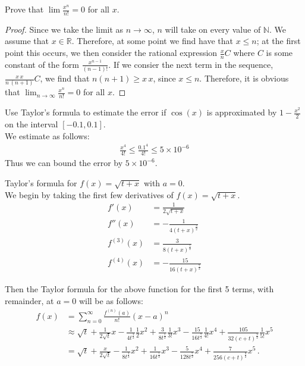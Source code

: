 \documentclass[12pt]{book}
\newcommand{\N}{\mathbb{N}}
\newcommand{\R}{\mathbb{R}}
\newenvironment{exercise}[2][Exercise]{\begin{trivlist}
\item[\hskip \labelsep {\bfseries #1}\hskip \labelsep {\bfseries #2.}]}{\end{trivlist}}
\begin{document}
\begin{exercise}{6.5.1}
Prove that $\lim \frac{x^n}{n!} = 0$ for all $x$.

\begin{proof}
    Since we take the limit as $n \to \infty$, $n$ will take on every value of $\N$. We assume that $x \in \R$. Therefore, at some point we find have that $x \leq n$; at the first point this occurs, we then consider the rational expression $\frac{x}{n} C$ where $C$ is some constant of the form $\frac{x^{n-1}}{\left(n-1\right)!}$. If we consier the next term in the sequence, $\frac{x\, x}{n\, (n+1)}C$, we find that $n \left(n+1\right)\geq x\,x$, since $x\leq n$. Therefore, it is obvious that $\lim_{n \to \infty} \frac{x^n}{n!}=0$ for all $x$.  
\end{proof}
\end{exercise}



\begin{exercise}{6.5.3}
Use Taylor's formula to estimate the error if $\cos(x)$ is approximated by $1-\frac{x^2}{2}$ on the interval $[-0.1,0.1]$. \\

We estimate as follows:
    \begin{align*}
       \frac{x^4}{4!} \leq \frac{0.1^4}{4!} \leq 5\times10^{-6}
    \end{align*}
    Thus we can bound the error by $5\times10^{-6}$.
\end{exercise}



\begin{exercise}{6.5.5}
Taylor's formula for $f(x) = \sqrt{ t+x}$ with $a=0$. \\

We begin by taking the first few derivatives of $f(x) = \sqrt{t+x}$.
    \begin{align*}
    f'(x) &= \frac{1}{2 \sqrt{t + x}} \\
    f''(x) &= - \frac{1}{4 \left(t + x\right)^{\frac{3}{2}}} \\
    f^{(3)} (x) &= \frac{3}{8 \left(t + x\right)^{\frac{5}{2}}} \\
    f^{(4)} (x) &= - \frac{15}{16 \left(t + x\right)^{\frac{7}{2}}}
    \end{align*}
    
    Then the Taylor formula for the above function for the first 5 terms, with remainder, at $a=0$ will be as follows:
    \begin{align*}
    f(x) &= \sum_{n=0}^\infty \frac{f^{(n)}(a)}{n!} (x-a)^n \\
    &\approx \sqrt{t} + \frac{1}{2 \sqrt{t}} x - \frac{1}{4 t^{\frac{3}{2}}}\frac{1}{2} x^2 + \frac{3}{8 t^{\frac{5}{2}}}  \frac{1}{3!}  x^3 - \frac{15}{16 t^{\frac{7}{2}}} \frac{1}{4!}  x^4 + \frac{105}{32 \left(c + t\right)^{\frac{9}{2}}} \frac{1}{5!} x^5 \\
    &= \sqrt{t} + \frac{x}{2 \sqrt{t}} - \frac{1}{8 t^{\frac{3}{2}}} x^2 + \frac{1}{16 t^\frac{5}{2}} x^3 - \frac{5}{128 t^\frac{7}{2}} x^4 + \frac{7}{256 \left(c+t\right)^\frac{9}{2}} x^5 \,.
    \end{align*}
\end{exercise}
\end{document}
